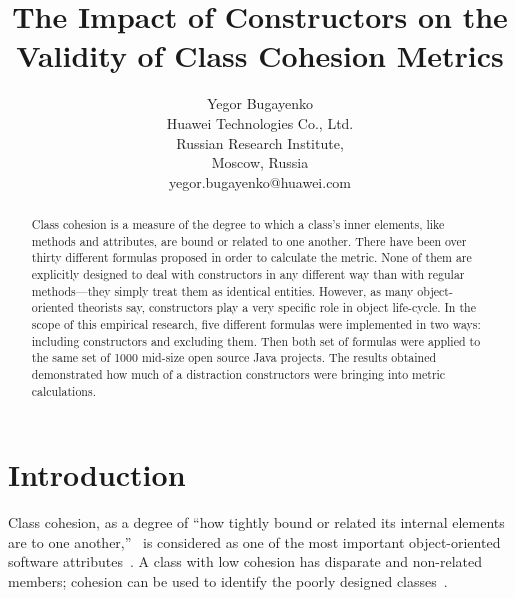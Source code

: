 \documentclass[conference]{IEEEtran}
\begin{document}
\title{The Impact of Constructors on the Validity of Class Cohesion Metrics}
\author{Yegor Bugayenko\\
Huawei Technologies Co., Ltd.\\
Russian Research Institute,\\
Moscow, Russia\\
yegor.bugayenko@huawei.com}

\maketitle

\begin{abstract}
Class cohesion is a measure of the degree to which a class's
inner elements, like methods and attributes, are bound or related
to one another. There have been over thirty different formulas proposed in order to
calculate the metric. None of them are explicitly designed to
deal with constructors in any different way than with regular methods---they
simply treat them as identical entities.
However, as many object-oriented theorists say, constructors
play a very specific role in object life-cycle. In the scope of this empirical
research, five different formulas were implemented in two ways: including
constructors and excluding them. Then both set of formulas were applied to
the same set of 1000 mid-size open source Java projects. The results obtained demonstrated
how much of a distraction constructors were bringing into metric calculations.
\end{abstract}

\section{Introduction}

Class cohesion, as a degree of ``how tightly bound or related its internal
elements are to one another,''~\cite{yourdon78}
is considered as one of the most important object-oriented software
attributes~\cite{badri08,yourdon78,kabaili01}.
A class with low cohesion has disparate and non-related members;
cohesion can be used to identify the poorly designed classes~\cite{badri08,basili96,chowdhury11}.
\end{document}
